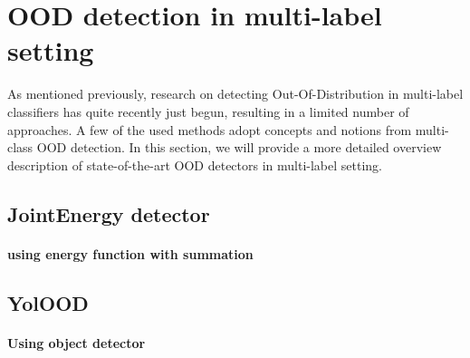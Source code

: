 \section{OOD detection in multi-label setting}
As mentioned previously, research on detecting Out-Of-Distribution in multi-label classifiers has quite recently just begun, 
resulting in a limited number of approaches. 
A few of the used methods adopt concepts and notions from multi-class OOD detection. 
In this section, we will provide a more detailed overview description of state-of-the-art OOD detectors in multi-label setting.

\subsection{JointEnergy detector}
\paragraph{using energy function with summation}

\subsection{YolOOD}
\paragraph{Using object detector}